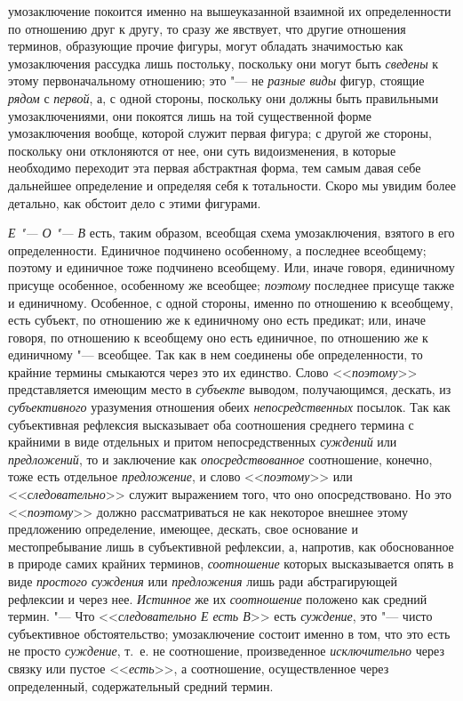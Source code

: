 умозаключение покоится именно на вышеуказанной взаимной их определенности
по отношению друг к другу, то сразу же явствует, что другие отношения
терминов, образующие прочие фигуры, могут обладать значимостью как
умозаключения рассудка лишь постольку, поскольку они могут быть
{\em сведены} к этому
первоначальному отношению; это "--- не
{\em разные виды} фигур,
стоящие {\em рядом} с
{\em первой}, а, с одной
стороны, поскольку они должны быть правильными умозаключениями, они
покоятся лишь на той существенной форме умозаключения вообще, которой
служит первая фигура; с другой же стороны, поскольку они отклоняются от
нее, они суть видоизменения, в которые необходимо переходит эта первая
абстрактная форма, тем самым давая себе дальнейшее определение и определяя
себя к тотальности. Скоро мы увидим более детально, как обстоит дело с
этими фигурами.

{\em Е "--- О "--- В} есть, таким образом, всеобщая схема
умозаключения, взятого в его определенности. Единичное подчинено
особенному, а последнее всеобщему; поэтому и единичное тоже подчинено
всеобщему. Или, иначе говоря, единичному присуще особенное, особенному же
всеобщее; {\em поэтому}
последнее присуще также и единичному. Особенное, с одной
стороны, именно по отношению к всеобщему, есть субъект, по отношению же к
единичному оно есть предикат; или, иначе говоря, по отношению к всеобщему
оно есть единичное, по отношению же к единичному "--- всеобщее.
Так как в нем соединены обе определенности, то крайние термины смыкаются
через это их единство. Слово
<<{\em поэтому}>>
представляется имеющим место в
{\em субъекте} выводом,
получающимся, дескать, из
{\em субъективного}
уразумения отношения обеих
{\em непосредственных}
посылок. Так как субъективная рефлексия высказывает оба
соотношения среднего термина с крайними в виде отдельных и притом
непосредственных {\em суждений}
или {\em предложений},
то и заключение как
{\em опосредствованное}
соотношение, конечно, тоже есть отдельное
{\em предложение}, и
слово <<{\em поэтому}>> или
<<{\em следовательно}>>
служит выражением того, что оно опосредствовано. Но это
<<{\em поэтому}>> должно
рассматриваться не как некоторое внешнее этому предложению определение,
имеющее, дескать, свое основание и местопребывание лишь в субъективной
рефлексии, а, напротив, как обоснованное в природе самих крайних терминов,
{\em соотношение} которых
высказывается опять в виде {\em простого
суждения} или
{\em предложения} лишь
ради абстрагирующей рефлексии и через нее.
{\em Истинное} же их
{\em соотношение}
положено как средний термин. "--- Что
<<{\em следовательно Е есть В}>>
есть {\em суждение},
это "--- чисто субъективное обстоятельство;
умозаключение состоит именно в том, что это есть не просто
{\em суждение}, т.~е. не
соотношение, произведенное
{\em исключительно} через
связку или пустое <<{\em есть}>>,
а соотношение, осуществленное через определенный,
содержательный средний термин.

